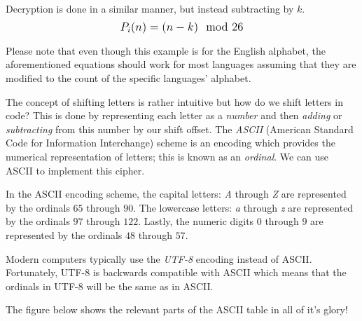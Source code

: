 Decryption is done in a similar manner, but instead subtracting by $k$. $$\mathlarger{P_i(n)=(n-k)\mod{26}}$$

Please note that even though this example is for the English alphabet, the aforementioned equations should work for most languages assuming that they are modified
to the count of the specific languages' alphabet.

The concept of shifting letters is rather intuitive but how do we shift letters in code? This is done by representing
each letter as a \textit{number} and then \textit{adding} or \textit{subtracting} from this number by our shift
offset. The \textit{ASCII} (American Standard Code for Information Interchange) scheme is an encoding which 
provides the numerical representation of letters; this is known as an \textit{ordinal}. 
We can use ASCII to implement this cipher. 

In the ASCII encoding scheme, the capital letters: \textit{A} through \textit{Z} are represented by the ordinals $65$ through 
$90$. The lowercase letters: \textit{a} through \textit{z} are represented by the ordinals $97$ through $122$. 
Lastly, the numeric digits $0$ through $9$ are represented by the ordinals $48$ through $57$.

Modern computers typically use the \textit{UTF-8} encoding instead of ASCII. Fortunately, UTF-8 is backwards compatible
with ASCII which means that the ordinals in UTF-8 will be the same as in ASCII.

The figure below shows the relevant parts of the ASCII table in all of it's glory!

